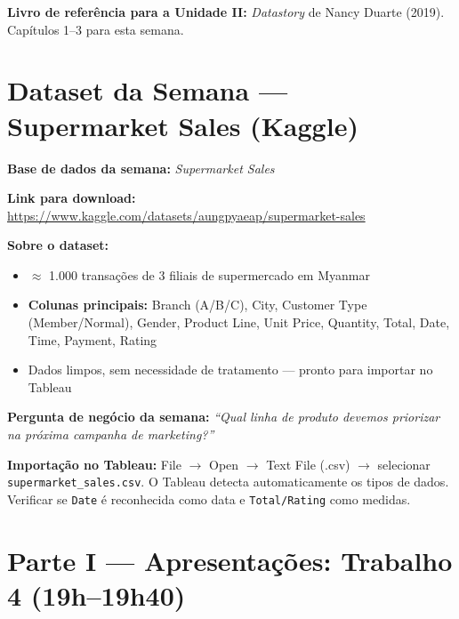 \begin{NoteBox}
\textbf{Livro de referência para a Unidade II:} \textit{Datastory} de Nancy Duarte
(2019). Capítulos 1–3 para esta semana.
\end{NoteBox}

\section{Dataset da Semana — Supermarket Sales (Kaggle)}

\begin{BoardBox}
\textbf{Base de dados da semana:} \textit{Supermarket Sales}

\textbf{Link para download:}
\url{https://www.kaggle.com/datasets/aungpyaeap/supermarket-sales}

\textbf{Sobre o dataset:}
\begin{itemize}
  \item $\approx$ 1.000 transações de 3 filiais de supermercado em Myanmar
  \item \textbf{Colunas principais:} Branch (A/B/C), City, Customer Type (Member/Normal),
  Gender, Product Line, Unit Price, Quantity, Total, Date, Time, Payment, Rating
  \item Dados limpos, sem necessidade de tratamento — pronto para importar no Tableau
\end{itemize}

\textbf{Pergunta de negócio da semana:}
\textit{``Qual linha de produto devemos priorizar na próxima campanha de marketing?''}
\end{BoardBox}

\begin{NoteBox}
\textbf{Importação no Tableau:} File $\to$ Open $\to$ Text File (.csv) $\to$
selecionar \texttt{supermarket\_sales.csv}. O Tableau detecta automaticamente
os tipos de dados. Verificar se \texttt{Date} é reconhecida como data e
\texttt{Total/Rating} como medidas.
\end{NoteBox}

\section{Parte I — Apresentações: Trabalho 4 (19h–19h40)}

